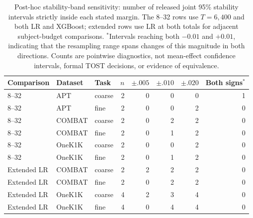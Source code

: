 \begin{table}[htbp]
\centering\small
\begin{tabular}{lllrrrrr}
\toprule
Comparison & Dataset & Task & $n$ & $\pm .005$ & $\pm .010$ & $\pm .020$ & Both signs$^*$ \\
\midrule
8--32 & APT & coarse & 2 & 0 & 0 & 0 & 1 \\
8--32 & APT & fine & 2 & 0 & 0 & 2 & 0 \\
8--32 & COMBAT & coarse & 2 & 0 & 2 & 2 & 0 \\
8--32 & COMBAT & fine & 2 & 0 & 1 & 2 & 0 \\
8--32 & OneK1K & coarse & 2 & 0 & 0 & 2 & 0 \\
8--32 & OneK1K & fine & 2 & 0 & 1 & 2 & 0 \\
Extended LR & COMBAT & coarse & 2 & 2 & 2 & 2 & 0 \\
Extended LR & COMBAT & fine & 2 & 0 & 2 & 2 & 0 \\
Extended LR & OneK1K & coarse & 4 & 2 & 3 & 4 & 0 \\
Extended LR & OneK1K & fine & 4 & 0 & 4 & 4 & 0 \\
\bottomrule
\end{tabular}
\caption{Post-hoc stability-band sensitivity: number of released joint 95\% stability intervals strictly inside each stated margin. The 8--32 rows use $T=6{,}400$ and both LR and XGBoost; extended rows use LR at both totals for adjacent subject-budget comparisons. $^*$Intervals reaching both $-0.01$ and $+0.01$, indicating that the resampling range spans changes of this magnitude in both directions. Counts are pointwise diagnostics, not mean-effect confidence intervals, formal TOST decisions, or evidence of equivalence.}
\label{tab:equivalence_sensitivity}
\end{table}
